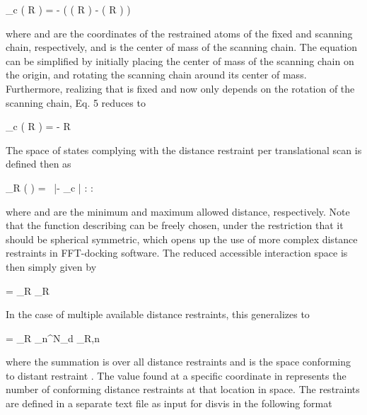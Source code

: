 \startformula
\rvec_c \left( R \right) = \rvecF - \left( \rvecS \left( R \right) - \rveccomS \left( R \right) \right)
\stopformula

where \m{\rvecF} and \m{\rvecS} are the coordinates of the restrained atoms of the fixed and
scanning chain, respectively, and \m{\rveccomS} is the center of mass of the scanning
chain. The equation can be simplified by initially placing the center of mass
of the scanning chain on the origin, and rotating the scanning chain around its
center of mass. Furthermore, realizing that \m{\rvecF} is fixed and \m{\rvecS} now only depends
on the rotation of the scanning chain, Eq. 5 reduces to

\startformula
\rvec_c \left( R \right) = \rvecF - R \rvecS
\stopformula

The space of states complying with the distance restraint per translational
scan  is defined then as

\startformula
\boldL_R \left( \rvec \right) = \startmathcases
\NC {}\ \dmin \leq |\rvec - \rvec_c | \leq \dmax:  \NR
\NC \NC \NR
\NC {}: \NR
\stopmathcases
\stopformula

where \m{\dmin} and \m{\dmax} are the minimum and maximum allowed distance, respectively.
Note that the function describing  can be freely chosen, under the
restriction that it should be spherical symmetric, which opens up the use of
more complex distance restraints in FFT-docking software. The reduced
accessible interaction space \m{\redais} is then simply given by

\startformula
\redais = \boldA_R \times \boldL_R
\stopformula

In the case of multiple available distance restraints, this generalizes to

\startformula
\redais = \boldA_R \times \sum_n^{N_d} \boldL_{R,n}
\stopformula

where the summation is over all distance restraints  and  is the space
conforming to distant restraint . The value found at a specific coordinate in
\m{\redais} represents the number of conforming distance restraints at that
location in space. The restraints are defined in a separate text file as input
for disvis in the following format
%
%

